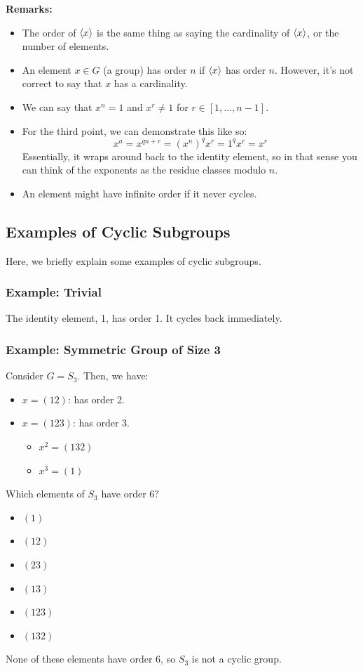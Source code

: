 \documentclass[letterpaper]{article}
\begin{document}
\textbf{Remarks:}
\begin{itemize}
    \item The order of $\langle x \rangle$ is the same thing as saying the cardinality of $\langle x \rangle$, or the number of elements. 
    \item An element $x \in G$ (a group) has order $n$ if $\langle x \rangle$ has order $n$. However, it's not correct to say that $x$ has a cardinality. 
    \item We can say that $x^n = 1$ and $x^r \neq 1$ for $r \in [1, \dots, n - 1]$. 
    \item For the third point, we can demonstrate this like so: 
    \[x^a = x^{qn + r} = (x^{n})^{q} x^r = 1^q x^r = x^r\]
    Essentially, it wraps around back to the identity element, so in that sense you can think of the exponents as the residue classes modulo $n$. 
    \item An element might have infinite order if it never cycles. 
\end{itemize}

\subsection{Examples of Cyclic Subgroups}
Here, we briefly explain some examples of cyclic subgroups.

\subsubsection{Example: Trivial}
The identity element, 1, has order 1. It cycles back immediately. 

\subsubsection{Example: Symmetric Group of Size 3}
Consider $G = S_3$. Then, we have: 
\begin{itemize}
    \item $x = (1 2)$: has order 2. 
    \item $x = (1 2 3)$: has order 3.
    \begin{itemize}
        \item $x^2 = (1 3 2)$
        \item $x^3 = (1)$
    \end{itemize}
\end{itemize}
Which elements of $S_3$ have order 6? 
\begin{itemize}
    \item $(1)$
    \item $(1 2)$
    \item $(2 3)$
    \item $(1 3)$
    \item $(1 2 3)$
    \item $(1 3 2)$
\end{itemize}
None of these elements have order 6, so $S_3$ is not a cyclic group. 
\end{document}
